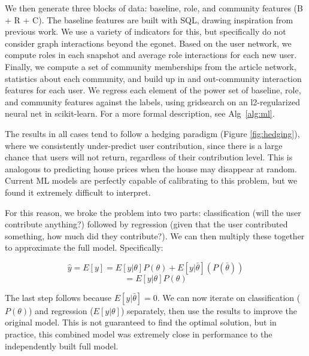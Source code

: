 \documentclass[letterpaper, 12pt, conference]{ieeeconf}
\begin{document}
We then generate three blocks of data: baseline, role, and community features (B + R + C). The baseline features are built with SQL, drawing inspiration from previous work\cite{burke2008mopping}\cite{leskovec2010governance}\cite{anderson2012discovering}. We use a variety of indicators for this, but specifically do not consider graph interactions beyond the egonet. Based on the user network, we compute roles in each snapshot and average role interactions for each new user. Finally, we compute a set of community memberships from the article network, statistics about each community, and build up in and out-community interaction features for each user. We regress each element of the power set of baseline, role, and community features against the labels, using gridsearch on an l2-regularized neural net in scikit-learn. For a more formal description, see Alg~\ref{alg:ml}.

The results in all cases tend to follow a hedging paradigm (Figure \ref{fig:hedging}), where we consistently under-predict user contribution, since there is a large chance that users will not return, regardless of their contribution level. This is analogous to predicting house prices when the house may disappear at random. Current ML models are perfectly capable of calibrating to this problem, but we found it extremely difficult to interpret. 

For this reason, we broke the problem into two parts: classification (will the user contribute anything?) followed by regression (given that the user contributed something, how much did they contribute?). We can then multiply these together to approximate the full model. Specifically:

\begin{equation*}
     \hat{y} = E[y] 
    = E[y|\theta]P(\theta) + E[y|\bar{\theta}](P(\bar{\theta})) 
\end{equation*}
\begin{equation}
    = E[y|\theta]P(\theta)
\end{equation}

The last step follows because $E[y|\bar{\theta}] = 0$. We can now iterate on classification ($P(\theta)$) and regression ($E[y|\theta]$) separately, then use the results to improve the original model. This is not guaranteed to find the optimal solution, but in practice, this combined model was extremely close in performance to the independently built full model. 
\end{document}
